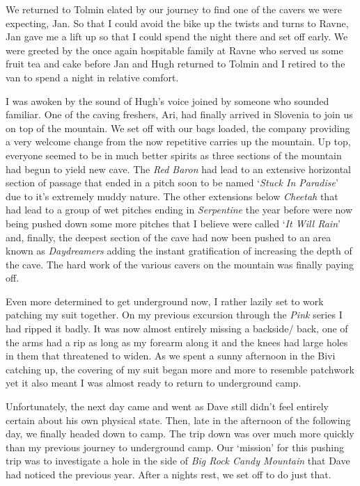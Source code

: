 We returned to Tolmin elated by our journey to find one of the cavers we
were expecting, Jan. So that I could avoid the bike up the twists and
turns to Ravne, Jan gave me a lift up so that I could spend the night
there and set off early. We were greeted by the once again hospitable
family at Ravne who served us some fruit tea and cake before Jan and
Hugh returned to Tolmin and I retired to the van to spend a night in
relative comfort.

I was awoken by the sound of Hugh's voice joined by someone who sounded
familiar. One of the caving freshers, Ari, had finally arrived in
Slovenia to join us on top of the mountain. We set off with our bags
loaded, the company providing a very welcome change from the now
repetitive carries up the mountain. Up top, everyone seemed to be in
much better spirits as three sections of the mountain had begun to yield
new cave. The \emph{Red Baron} had lead to an extensive horizontal
section of passage that ended in a pitch soon to be named `\emph{Stuck
In Paradise}' due to it's extremely muddy nature. The other extensions
below \emph{Cheetah} that had lead to a group of wet pitches ending in
\emph{Serpentine} the year before were now being pushed down some more
pitches that I believe were called `\emph{It Will Rain}' and, finally,
the deepest section of the cave had now been pushed to an area known as
\emph{Daydreamers} adding the instant gratification of increasing the
depth of the cave. The hard work of the various cavers on the mountain
was finally paying off.

Even more determined to get underground now, I rather lazily set to work
patching my suit together. On my previous excursion through the
\emph{Pink} series I had ripped it badly. It was now almost entirely
missing a backside/ back, one of the arms had a rip as long as my
forearm along it and the knees had large holes in them that threatened
to widen. As we spent a sunny afternoon in the Bivi catching up, the
covering of my suit began more and more to resemble patchwork yet it
also meant I was almost ready to return to underground camp.

Unfortunately, the next day came and went as Dave still didn't feel
entirely certain about his own physical state. Then, late in the
afternoon of the following day, we finally headed down to camp. The trip
down was over much more quickly than my previous journey to underground
camp. Our `mission' for this pushing trip was to investigate a hole in
the side of \emph{Big Rock Candy Mountain} that Dave had noticed the
previous year. After a nights rest, we set off to do just that.


